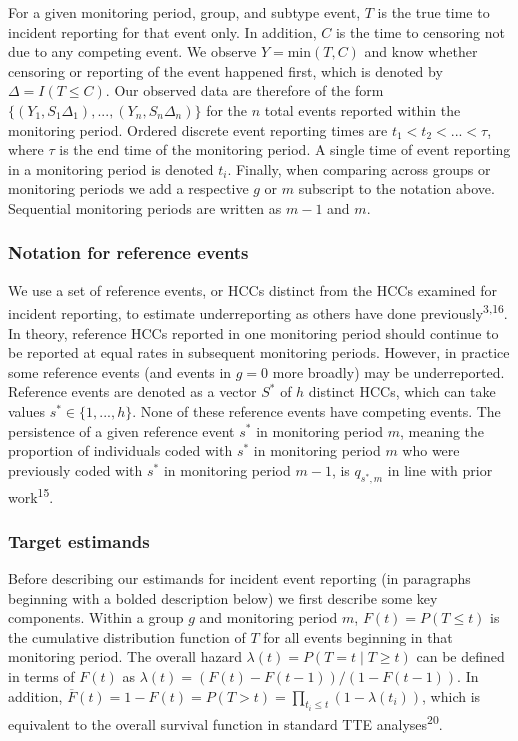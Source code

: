 \documentclass[
  12pt,
  number]{elsarticle}
\begin{document}
For a given monitoring period, group, and subtype event, \(T\) is the
true time to incident reporting for that event only. In addition, \(C\)
is the time to censoring not due to any competing event. We observe
\(Y= \text{min}(T, C)\) and know whether censoring or reporting of the
event happened first, which is denoted by \(\Delta = I(T \le C)\). Our
observed data are therefore of the form
\(\{(Y_1, S_1\Delta_1),...,(Y_n, S_n\Delta_n)\}\) for the \(n\) total
events reported within the monitoring period. Ordered discrete event
reporting times are \(t_1 < t_2 < ... < \tau\), where \(\tau\) is the
end time of the monitoring period. A single time of event reporting in a
monitoring period is denoted \(t_i\). Finally, when comparing across
groups or monitoring periods we add a respective \(g\) or \(m\)
subscript to the notation above. Sequential monitoring periods are
written as \(m-1\) and \(m\).

\subsubsection{Notation for reference
events}\label{notation-for-reference-events}

We use a set of reference events, or HCCs distinct from the HCCs
examined for incident reporting, to estimate underreporting as others
have done previously\textsuperscript{3,16}. In theory, reference HCCs
reported in one monitoring period should continue to be reported at
equal rates in subsequent monitoring periods. However, in practice some
reference events (and events in \(g=0\) more broadly) may be
underreported. Reference events are denoted as a vector \(S^*\) of \(h\)
distinct HCCs, which can take values \(s^* \in \{1, ..., h\}\). None of
these reference events have competing events. The persistence of a given
reference event \(s^*\) in monitoring period \(m\), meaning the
proportion of individuals coded with \(s^*\) in monitoring period \(m\)
who were previously coded with \(s^*\) in monitoring period \(m-1\), is
\(q_{s^*,m}\) in line with prior work\textsuperscript{15}.

\subsubsection{Target estimands}\label{target-estimands}

Before describing our estimands for incident event reporting (in
paragraphs beginning with a bolded description below) we first describe
some key components. Within a group \(g\) and monitoring period \(m\),
\(F(t) = P(T \le t)\) is the cumulative distribution function of \(T\)
for all events beginning in that monitoring period. The overall hazard
\(\lambda (t) = P(T = t \mid T \ge t)\) can be defined in terms of
\(F(t)\) as \(\lambda (t) = (F(t) - F(t-1))/(1-F(t-1))\). In addition,
\(\overline{F}(t) = 1 - F(t) = P(T > t) = \prod_{t_i \le t} (1 - \lambda(t_i))\),
which is equivalent to the overall survival function in standard TTE
analyses\textsuperscript{20}.
\end{document}
